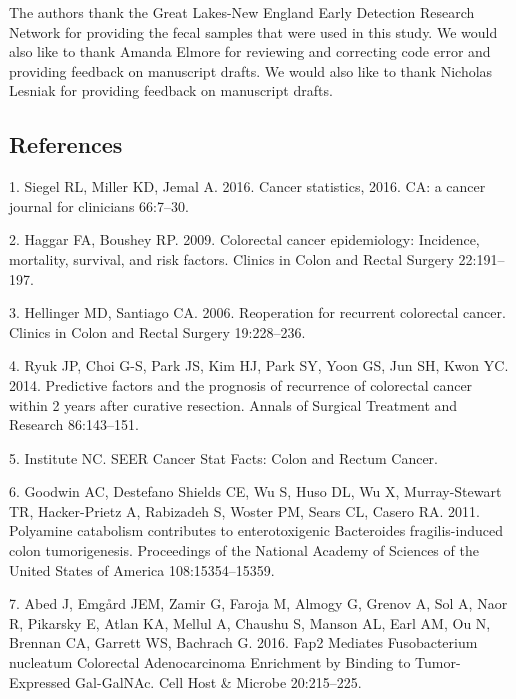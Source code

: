 \documentclass[12pt,]{article}
\begin{document}
The authors thank the Great Lakes-New England Early Detection Research
Network for providing the fecal samples that were used in this study. We
would also like to thank Amanda Elmore for reviewing and correcting code
error and providing feedback on manuscript drafts. We would also like to
thank Nicholas Lesniak for providing feedback on manuscript drafts.

\newpage

\subsection{References}\label{references}

\hypertarget{refs}{}
\hypertarget{ref-siegel_cancer_2016}{}
1. Siegel RL, Miller KD, Jemal A. 2016. Cancer statistics, 2016. CA: a
cancer journal for clinicians 66:7--30.

\hypertarget{ref-haggar_colorectal_2009}{}
2. Haggar FA, Boushey RP. 2009. Colorectal cancer epidemiology:
Incidence, mortality, survival, and risk factors. Clinics in Colon and
Rectal Surgery 22:191--197.

\hypertarget{ref-hellinger_reoperation_2006}{}
3. Hellinger MD, Santiago CA. 2006. Reoperation for recurrent colorectal
cancer. Clinics in Colon and Rectal Surgery 19:228--236.

\hypertarget{ref-ryuk_predictive_2014}{}
4. Ryuk JP, Choi G-S, Park JS, Kim HJ, Park SY, Yoon GS, Jun SH, Kwon
YC. 2014. Predictive factors and the prognosis of recurrence of
colorectal cancer within 2 years after curative resection. Annals of
Surgical Treatment and Research 86:143--151.

\hypertarget{ref-national_cancer_institute_seer_nodate}{}
5. Institute NC. SEER Cancer Stat Facts: Colon and Rectum Cancer.

\hypertarget{ref-goodwin_polyamine_2011}{}
6. Goodwin AC, Destefano Shields CE, Wu S, Huso DL, Wu X, Murray-Stewart
TR, Hacker-Prietz A, Rabizadeh S, Woster PM, Sears CL, Casero RA. 2011.
Polyamine catabolism contributes to enterotoxigenic Bacteroides
fragilis-induced colon tumorigenesis. Proceedings of the National
Academy of Sciences of the United States of America 108:15354--15359.

\hypertarget{ref-abed_fap2_2016}{}
7. Abed J, Emgård JEM, Zamir G, Faroja M, Almogy G, Grenov A, Sol A,
Naor R, Pikarsky E, Atlan KA, Mellul A, Chaushu S, Manson AL, Earl AM,
Ou N, Brennan CA, Garrett WS, Bachrach G. 2016. Fap2 Mediates
Fusobacterium nucleatum Colorectal Adenocarcinoma Enrichment by Binding
to Tumor-Expressed Gal-GalNAc. Cell Host \& Microbe 20:215--225.
\end{document}
